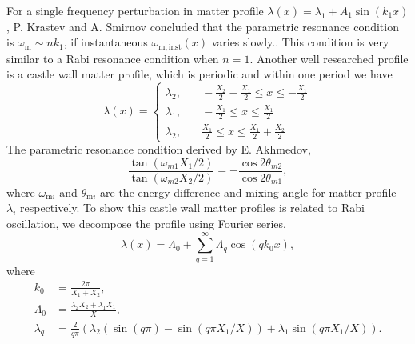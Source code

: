 \documentclass[%
reprint,
 amsmath,amssymb,
 aps,
]{revtex4-1}
\begin{document}

For a single frequency perturbation in matter profile $\lambda(x) =\lambda_1 +  A_1\sin(k_1 x)$, P. Krastev and A. Smirnov concluded that the parametric resonance condition is $\omega_{\mathrm{m}} \sim n k_1$, if instantaneous $\omega_{\mathrm{m,inst}}(x)$ varies slowly.\cite{Krastev1989}. This condition is very similar to a Rabi resonance condition when $n=1$. Another well researched profile is a castle wall matter profile, which is periodic and within one period we have
\begin{equation}
    \lambda(x) = \begin{cases} \lambda_2 , &\quad -\frac{X_2}{2}-\frac{X_1}{2}\le x \le -\frac{X_1}{2} \\
\lambda_1, &\quad -\frac{X_1}{2}\le x\le \frac{X_1}{2} \\
\lambda_2, &\quad \frac{X_1}{2}\le x\le \frac{X_1}{2}+\frac{X_2}{2}
\end{cases}
\end{equation}
The parametric resonance condition derived by E. Akhmedov\cite{Akhmedov2000},
\begin{equation}
    \frac{\tan (\omega_{m1}X_1/2)}{\tan (\omega_{m2}X_2/2)} = - \frac{\cos 2\theta_{m2}}{\cos 2\theta_{m1}},
\end{equation}
where $\omega_{\mathrm{m}i}$ and $\theta_{\mathrm{m}i}$ are the energy difference and mixing angle for matter profile $\lambda_i$ respectively. To show this castle wall matter profiles is related to Rabi oscillation, we decompose the profile using Fourier series,
\begin{equation}
\lambda(x) = \Lambda_0 + \sum_{q=1}^{\infty} \Lambda_q \cos\left( q k_0  x \right),
\end{equation}
where 
\begin{align*}
k_0 &= \frac{2\pi}{X_1+X_2}, \\
\Lambda_0 &= \frac{\lambda_2 X_2 + \lambda_1 X_1}{X}, \\
\lambda_q & = \frac{2}{q\pi} \left( \lambda_2\left( \sin(q \pi ) - \sin(q \pi X_1/X) \right) + \lambda_1 \sin( q\pi X_1/X)  \right).
\end{align*}
\end{document}
